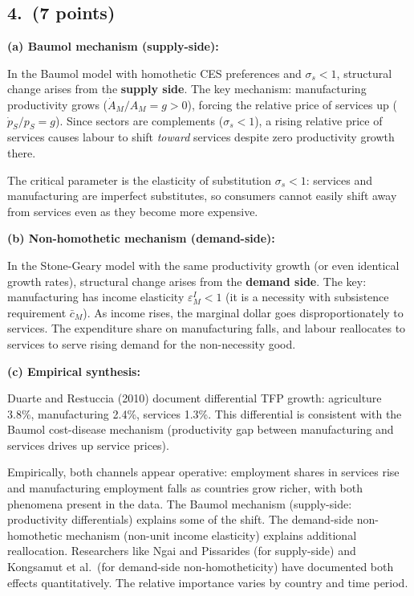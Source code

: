 \documentclass[a4paper,11pt]{article}
\begin{document}
\subsection*{4.\ (7 points)}

\begin{answerbox}
\textbf{(a) Baumol mechanism (supply-side):}

In the Baumol model with homothetic CES preferences and $\sigma_s < 1$, structural change arises from the \textbf{supply side}. The key mechanism: manufacturing productivity grows ($\dot{A}_M/A_M = g > 0$), forcing the relative price of services up ($\dot{p}_S/p_S = g$). Since sectors are complements ($\sigma_s < 1$), a rising relative price of services causes labour to shift \emph{toward} services despite zero productivity growth there.

The critical parameter is the elasticity of substitution $\sigma_s < 1$: services and manufacturing are imperfect substitutes, so consumers cannot easily shift away from services even as they become more expensive.

\textbf{(b) Non-homothetic mechanism (demand-side):}

In the Stone-Geary model with the same productivity growth (or even identical growth rates), structural change arises from the \textbf{demand side}. The key: manufacturing has income elasticity $\varepsilon_M^I < 1$ (it is a necessity with subsistence requirement $\bar{c}_M$). As income rises, the marginal dollar goes disproportionately to services. The expenditure share on manufacturing falls, and labour reallocates to services to serve rising demand for the non-necessity good.

\textbf{(c) Empirical synthesis:}

Duarte and Restuccia (2010) document differential TFP growth: agriculture 3.8\%, manufacturing 2.4\%, services 1.3\%. This differential is consistent with the Baumol cost-disease mechanism (productivity gap between manufacturing and services drives up service prices).

Empirically, both channels appear operative: employment shares in services rise and manufacturing employment falls as countries grow richer, with both phenomena present in the data. The Baumol mechanism (supply-side: productivity differentials) explains some of the shift. The demand-side non-homothetic mechanism (non-unit income elasticity) explains additional reallocation. Researchers like Ngai and Pissarides (for supply-side) and Kongsamut et al.\ (for demand-side non-homotheticity) have documented both effects quantitatively. The relative importance varies by country and time period.
\end{answerbox}
\end{document}
